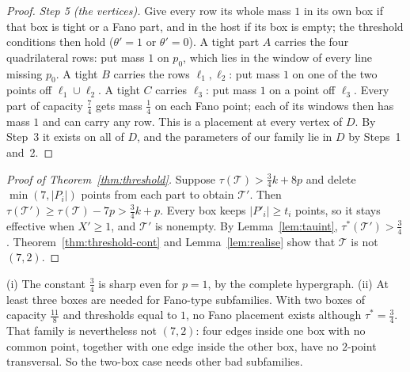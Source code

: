 \begin{proof}
\emph{Step 5 (the vertices).} Give every row its whole mass $1$ in its own box if that box is tight or a Fano part, and in the host if its box is empty; the threshold conditions then hold ($\theta'=1$ or $\theta'=0$). A tight part $A$ carries the four quadrilateral rows: put mass $1$ on $p_0$, which lies in the window of every line missing $p_0$. A tight $B$ carries the rows $\ell_1,\ell_2$: put mass $1$ on one of the two points off $\ell_1\cup\ell_2$. A tight $C$ carries $\ell_3$: put mass $1$ on a point off $\ell_3$. Every part of capacity $\frac74$ gets mass $\frac14$ on each Fano point; each of its windows then has mass $1$ and can carry any row. This is a placement at every vertex of $D$. By Step~3 it exists on all of $D$, and the parameters of our family lie in $D$ by Steps~1 and~2.
\end{proof}

\begin{proof}[Proof of Theorem~\ref{thm:threshold}]
Suppose $\tau(\mathcal T)>\frac34k+8p$ and delete $\min(7,|P_i|)$ points from each part to obtain $\mathcal T'$. Then $\tau(\mathcal T')\ge\tau(\mathcal T)-7p>\frac34k+p$. Every box keeps $|P'_i|\ge t_i$ points, so it stays effective when $X'\ge1$, and $\mathcal T'$ is nonempty. By Lemma~\ref{lem:tauint}, $\tau^*(\mathcal T')>\frac34$. Theorem~\ref{thm:threshold-cont} and Lemma~\ref{lem:realise} show that $\mathcal T$ is not $(7,2)$.
\end{proof}

\begin{remark}\label{rem:threshold}
(i) The constant $\frac34$ is sharp even for $p=1$, by the complete hypergraph.
(ii) At least three boxes are needed for Fano-type subfamilies. With two boxes of capacity $\frac{11}8$ and thresholds equal to $1$, no Fano placement exists although $\tau^*=\frac34$. That family is nevertheless not $(7,2)$: four edges inside one box with no common point, together with one edge inside the other box, have no $2$-point transversal. So the two-box case needs other bad subfamilies.
\end{remark}
